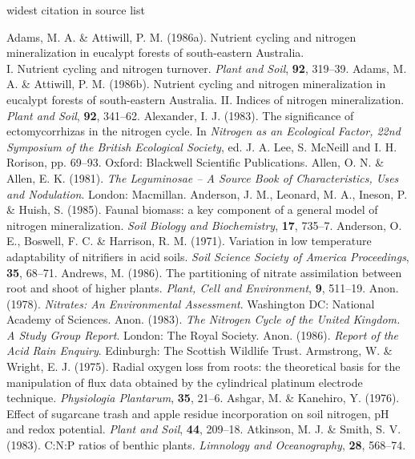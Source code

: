 \begin{thereferences}{widest citation in source list}

Adams, M. A. \& Attiwill, P. M. (1986a). Nutrient
cycling and nitrogen mineralization in eucalypt forests of
south-eastern Australia.\\ I. Nutrient cycling and nitrogen turnover.
{\it Plant and Soil}, {\bf 92}, 319--39.
Adams, M. A. \& Attiwill, P. M. (1986b). Nutrient
cycling and nitrogen mineralization in eucalypt forests of
south-eastern Australia. II. Indices of nitrogen mineralization. {\it Plant
and Soil}, {\bf 92}, 341--62.
Alexander, I. J. (1983). The significance of ectomycorrhizas
in the nitrogen cycle. In {\it Nitrogen as an Ecological Factor,
 22nd Symposium of the British Ecological Society}, ed.
J. A. Lee, S. McNeill and I. H. Rorison,
pp. 69--93. Oxford: Blackwell Scientific Publications.
Allen, O. N. \& Allen, E. K. (1981). {\it The
Leguminosae -- A Source Book of Characteristics, Uses
and Nodulation}. London: Macmillan.
Anderson, J. M., Leonard, M. A., Ineson, P. \& Huish,
S. (1985). Faunal biomass: a key component of a general model
of nitrogen mineralization.  {\it Soil Biology and Biochemistry},
{\bf 17}, 735--7.
Anderson, O. E., Boswell, F. C. \& Harrison, R. M.
(1971). Variation in low temperature adaptability of nitrifiers in
acid soils. {\it Soil Science Society of America Proceedings},
{\bf 35}, 68--71.
Andrews, M. (1986). The partitioning of nitrate assimilation
between root and shoot of higher plants. {\it Plant, Cell and
Environment}, {\bf 9}, 511--19.
Anon. (1978). {\it Nitrates:  An Environmental
Assessment}. Washington DC: National Academy of Sciences.
Anon. (1983). {\it The Nitrogen Cycle of the United Kingdom. A
Study Group Report}. London: The Royal Society.
Anon. (1986). {\it Report of the Acid Rain Enquiry}.
Edinburgh: The Scottish Wildlife Trust.
Armstrong, W. \& Wright, E. J. (1975). Radial oxygen loss from
roots: the theoretical basis for the manipulation of flux
data obtained by the cylindrical platinum electrode technique.
{\it Physiologia Plantarum}, {\bf 35}, 21--6.
Ashgar, M. \& Kanehiro, Y. (1976). Effect of sugarcane trash
and apple residue incorporation on soil nitrogen, pH and redox
potential. {\it Plant and Soil}, {\bf 44}, 209--18.
Atkinson, M. J. \& Smith, S. V. (1983). C:N:P ratios of
benthic plants. {\it Limnology and
Oceanography}, {\bf 28}, 568--74.

\end{thereferences}

